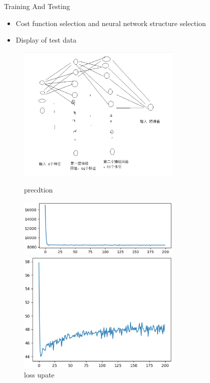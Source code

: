\documentclass[
 size=14pt,
 paper=smartboard,  %
 mode=present, 		%
 display=slides, 	%
 style=tuliplab,  	%
 pauseslide,
 fleqn,leqno]{powerdot}
\begin{document}
\begin{slide}{Training And Testing}


\begin{itemize}
  \item Cost function selection and neural network structure selection
\item  Display of test data
\end{itemize}

\begin{figure}[htbp]
  \centering
  \begin{minipage}[t]{0.38\textwidth}
    \centering
    \includegraphics[width=0.7\textwidth]{logos/7.eps}
    \vspace{-1.0em}
    \caption{precdtion}
  \end{minipage}
  \begin{minipage}[t]{0.38\textwidth}
    \centering
    \includegraphics[width=0.7\textwidth]{logos/1 (1).eps}
    \vspace{-1.0em}
    \caption{loss  upate }
  \end{minipage}
  \begin{minipage}[t]{0.38\textwidth}
    \centering
    \includegraphics[width=0.7\textwidth]{logos/1 (2).eps}

\end{minipage}
\end{figure}
\end{slide}
\end{document}
